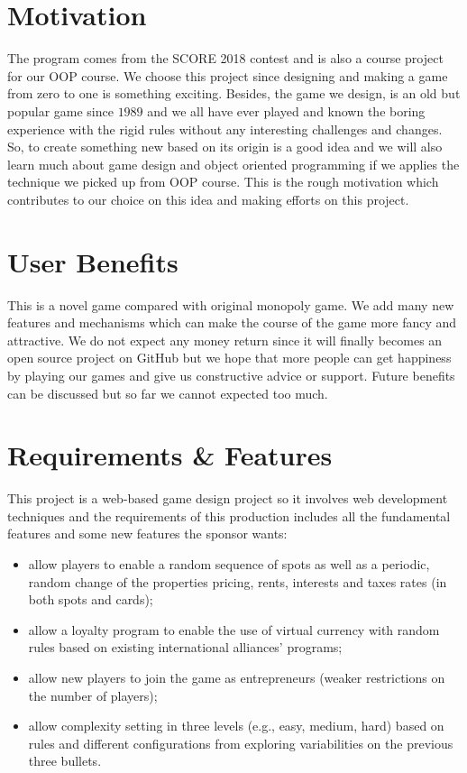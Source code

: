 \documentclass[a4paper,12pt]{article}
\begin{document}
\section{Motivation}
\lettrine[lines=2,loversize=0.35,lraise=0.07,findent=3pt,nindent=2pt]{T}{}he program comes from the SCORE 2018 contest and is also a course project for our OOP course. We choose this project since   designing and making a game from zero to one is something exciting. Besides, the game we design, is an old but popular game since $1989$ and we all have ever played and known the boring experience with the rigid rules without any interesting challenges and changes. So, to create something new based on its origin is a good idea and we will also learn much about game design and object oriented programming if we applies the technique we picked up from OOP course. This is the rough motivation which contributes to our choice on this idea and making efforts on this project.
\section{User Benefits}
\lettrine[lines=2,loversize=0.35,lraise=0.07,findent=3pt,nindent=2pt]{T}{}his is a novel game compared with original monopoly game. We add many new features and mechanisms which can make the course of the game more fancy and attractive. We do not expect   any money return since it will finally becomes an open source project on GitHub but we hope that more people can get happiness by playing our games and give us constructive advice or support. Future benefits can be discussed but so far we cannot expected too much.

\section{Requirements \& Features}	\lettrine[lines=2,loversize=0.35,lraise=0.07,findent=3pt,nindent=2pt]{T}{}his project is a web-based game design project so it involves web development techniques and the requirements of this production includes all the fundamental features and some new features the sponsor wants:
\begin{itemize}
	\item allow players to enable a random sequence of spots as well as a periodic, random change of the properties pricing, rents, interests and taxes rates (in both spots and cards);
	\item allow a loyalty program to enable the use of virtual currency with random rules based on existing international alliances’ programs;
	\item allow new players to join the game as entrepreneurs (weaker restrictions on the number of players);
	\item allow complexity setting in three levels (e.g., easy, medium, hard) based on rules and different configurations from exploring variabilities on the previous three bullets.
\end{itemize}
\end{document}
